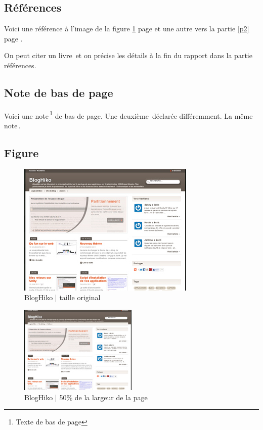 \subsection{Références}

Voici une référence à l'image de la figure \ref{bloghiko} page \pageref{bloghiko} et une autre vers la partie \ref{p2} page \pageref{p2}.

On peut citer un livre\, et on précise les détails à la fin du rapport dans la partie références.


\subsection{Note de bas de page}

Voici une note\,\footnote{Texte de bas de page} de bas de page.
Une deuxième\,\footnotemark{} déclarée différemment.
La même note\,\footnotemark[\value{footnote}].



\subsection{Figure}

\begin{figure}[!ht]
    \center
    \includegraphics[]{./images/bloghiko.jpg}
    \caption{BlogHiko | taille original}
    \label{bloghiko}
\end{figure}

\begin{figure}[!ht]
    \center
    \includegraphics[width=0.5\textwidth]{./images/bloghiko.jpg}
    \caption{BlogHiko | 50\% de la largeur de la page}
\end{figure}

